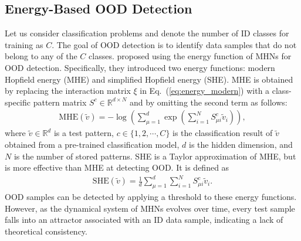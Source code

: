 \subsection{Energy-Based OOD Detection}
Let us consider classification problems and denote the number of ID classes for training as $C$.
The goal of OOD detection is to identify data samples that do not belong to any of the $C$ classes.
\citet{zhang23she} proposed using the energy function of MHNs for OOD detection.
Specifically, they introduced two energy functions: modern Hopfield energy (MHE) and simplified Hopfield energy (SHE).
MHE is obtained by replacing the interaction matrix $\xi$ in Eq.~(\ref{eq:energy_modern}) with a class-specific pattern matrix $S^{c} \in \mathbb{R}^{d \times N}$ and by omitting the second term as follows:
\begin{align}
\mathrm{MHE}(\tilde{v}) = 
- \log \left( \sum_{\mu=1}^{d} \exp \left( \sum_{i=1}^{N} S^{c}_{\mu i} \tilde{v}_{i} \right)\right),
\end{align}
where $\tilde{v} \in \mathbb{R}^{d}$ is a test pattern,
$c \in \{1, 2, \cdots, C\}$ is the classification result of $\tilde{v}$ obtained from a pre-trained classification model,
$d$ is the hidden dimension, and $N$ is the number of stored patterns.
SHE is a Taylor approximation of MHE, but is more effective than MHE at detecting OOD.
It is defined as
\begin{align}
\label{eq:she}
\mathrm{SHE}(\tilde{v}) = 
\frac{1}{d} \sum_{\mu = 1}^{d} \sum_{i = 1}^{N} S_{\mu i}^{c}\tilde{v}_{i}.
\end{align}
OOD samples can be detected by applying a threshold to these energy functions.
However, as the dynamical system of MHNs evolves over time, every test sample falls into an attractor associated with an ID data sample, indicating a lack of theoretical consistency.


